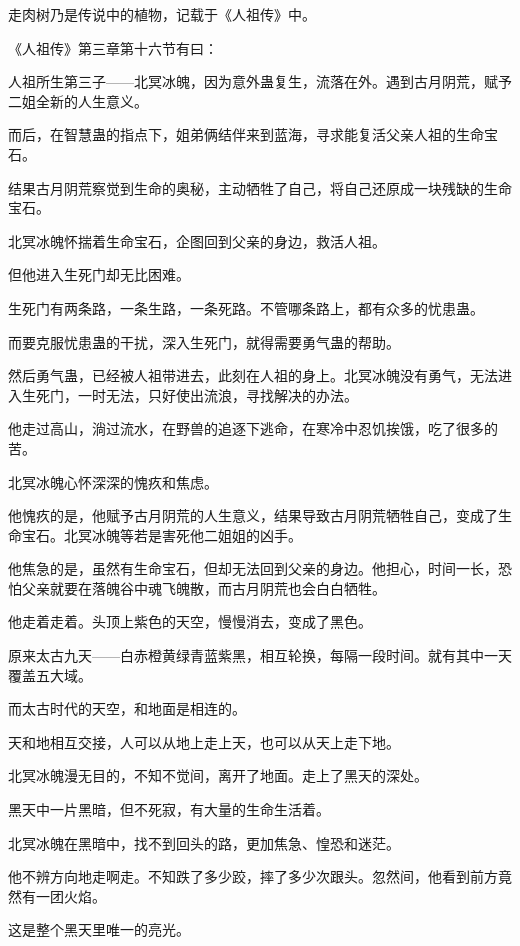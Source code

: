 
\begin{this_body}

走肉树乃是传说中的植物，记载于《人祖传》中。

《人祖传》第三章第十六节有曰：

人祖所生第三子——北冥冰魄，因为意外蛊复生，流落在外。遇到古月阴荒，赋予二姐全新的人生意义。

而后，在智慧蛊的指点下，姐弟俩结伴来到蓝海，寻求能复活父亲人祖的生命宝石。

结果古月阴荒察觉到生命的奥秘，主动牺牲了自己，将自己还原成一块残缺的生命宝石。

北冥冰魄怀揣着生命宝石，企图回到父亲的身边，救活人祖。

但他进入生死门却无比困难。

生死门有两条路，一条生路，一条死路。不管哪条路上，都有众多的忧患蛊。

而要克服忧患蛊的干扰，深入生死门，就得需要勇气蛊的帮助。

然后勇气蛊，已经被人祖带进去，此刻在人祖的身上。北冥冰魄没有勇气，无法进入生死门，一时无法，只好使出流浪，寻找解决的办法。

他走过高山，淌过流水，在野兽的追逐下逃命，在寒冷中忍饥挨饿，吃了很多的苦。

北冥冰魄心怀深深的愧疚和焦虑。

他愧疚的是，他赋予古月阴荒的人生意义，结果导致古月阴荒牺牲自己，变成了生命宝石。北冥冰魄等若是害死他二姐姐的凶手。

他焦急的是，虽然有生命宝石，但却无法回到父亲的身边。他担心，时间一长，恐怕父亲就要在落魄谷中魂飞魄散，而古月阴荒也会白白牺牲。

他走着走着。头顶上紫色的天空，慢慢消去，变成了黑色。

原来太古九天——白赤橙黄绿青蓝紫黑，相互轮换，每隔一段时间。就有其中一天覆盖五大域。

而太古时代的天空，和地面是相连的。

天和地相互交接，人可以从地上走上天，也可以从天上走下地。

北冥冰魄漫无目的，不知不觉间，离开了地面。走上了黑天的深处。

黑天中一片黑暗，但不死寂，有大量的生命生活着。

北冥冰魄在黑暗中，找不到回头的路，更加焦急、惶恐和迷茫。

他不辨方向地走啊走。不知跌了多少跤，摔了多少次跟头。忽然间，他看到前方竟然有一团火焰。

这是整个黑天里唯一的亮光。


\end{this_body}
